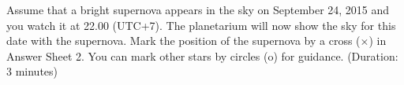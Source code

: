 Assume that a bright supernova appears in the sky on September 24, 2015 and
you watch it at 22.00 (UTC+7). The planetarium will now show the sky for
this date with the supernova. Mark the position of the supernova by a cross
($\times$) in Answer Sheet 2. You can mark other stars by circles (o) for
guidance. (Duration: 3 minutes)

